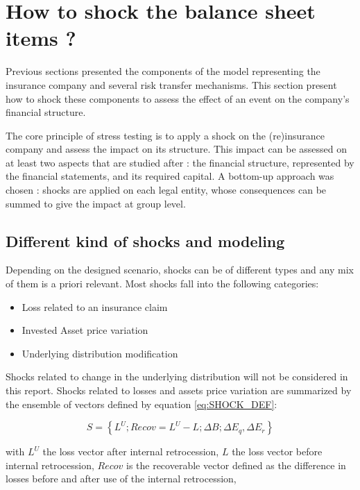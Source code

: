 \section{How to shock the balance sheet items ?}
\label{sec:SHOCK_BS}

Previous sections presented the components of the model representing the insurance company and several risk transfer mechanisms. This section present how to shock these components to assess the effect of an event on the company's financial structure.

The core principle of stress testing is to apply a shock on the (re)insurance company and assess the impact on its structure. This impact can be assessed on at least two aspects that are studied after : the financial structure, represented by the financial statements, and its required capital. A bottom-up approach was chosen : shocks are applied on each legal entity, whose consequences can be summed to give the impact at group level.


\subsection{Different kind of shocks and modeling}

Depending on the designed scenario, shocks can be of different types and any mix of them is a priori relevant. Most shocks fall into the following categories:


\begin{itemize}
    \item Loss related to an insurance claim
    \item Invested Asset price variation
    \item Underlying distribution modification
\end{itemize}

Shocks related to change in the underlying distribution will not be considered in this report. Shocks related to losses and assets price variation are summarized by the ensemble of vectors defined by equation \ref{eq:SHOCK_DEF}:


\begin{equation}
\label{eq:SHOCK_DEF}
    S = \left\{L^U ; Recov = L^U - L ; \Delta B ; \Delta E_q, \Delta E_r \right\}
\end{equation}


with $L^U$ the loss vector after internal retrocession, $L$ the loss vector before internal retrocession, $Recov$ is the recoverable vector defined as the difference in losses before and after use of the internal retrocession,

